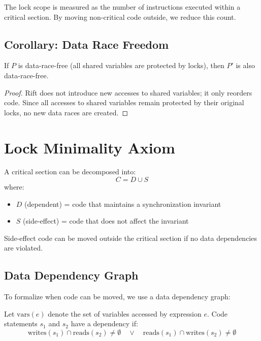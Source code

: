 \documentclass[11pt]{article}
\begin{document}
The lock scope is measured as the number of instructions executed within a critical section. By moving non-critical code outside, we reduce this count.

\subsection{Corollary: Data Race Freedom}

\begin{corollary} \label{cor:drf}
If $P$ is data-race-free (all shared variables are protected by locks), then $P'$ is also data-race-free.
\end{corollary}

\begin{proof}
Rift does not introduce new accesses to shared variables; it only reorders code. Since all accesses to shared variables remain protected by their original locks, no new data races are created.
\end{proof}

\section{Lock Minimality Axiom}

\begin{axiom} \label{ax:lockmin}
A critical section can be decomposed into:
\[
C = D \cup S
\]
where:
\begin{itemize}
    \item $D$ (dependent) = code that maintains a synchronization invariant
    \item $S$ (side-effect) = code that does not affect the invariant
\end{itemize}

Side-effect code can be moved outside the critical section if no data dependencies are violated.
\end{axiom}

\subsection{Data Dependency Graph}

To formalize when code can be moved, we use a data dependency graph:

\begin{definition}
Let $\text{vars}(e)$ denote the set of variables accessed by expression $e$. Code statements $s_1$ and $s_2$ have a dependency if:
\[
\text{writes}(s_1) \cap \text{reads}(s_2) \neq \emptyset \quad \lor \quad \text{reads}(s_1) \cap \text{writes}(s_2) \neq \emptyset
\]
\end{definition}
\end{document}
